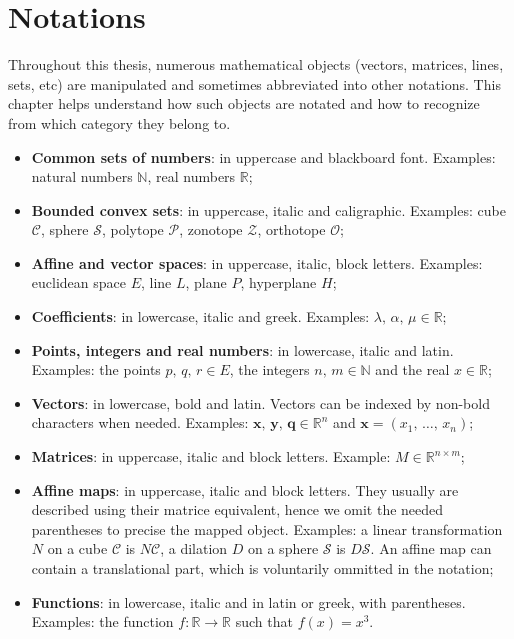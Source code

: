 
\chapter*{Notations}
\label{chapter:notations}

Throughout this thesis, numerous mathematical objects (vectors, matrices, lines, sets, etc) are manipulated and sometimes abbreviated into other notations.
This chapter helps understand how such objects are notated and how to recognize from which category they belong to.

\begin{itemize}
    \item {\textbf{Common sets of numbers}: in uppercase and blackboard font. Examples: natural numbers $\mathbb{N}$, real numbers $\mathbb{R}$;}
    \item {\textbf{Bounded convex sets}: in uppercase, italic and caligraphic. Examples: cube $\mathcal{C}$, sphere $\mathcal{S}$,
    polytope $\mathcal{P}$, zonotope $\mathcal{Z}$, orthotope $\mathcal{O}$;}
    \item{\textbf{Affine and vector spaces}: in uppercase, italic, block letters. Examples: euclidean space $E$, line $L$, plane $P$, hyperplane $H$;}
    \item {\textbf{Coefficients}: in lowercase, italic and greek. Examples: $\lambda,\, \alpha,\, \mu \in\mathbb{R}$;}
    \item {\textbf{Points, integers and real numbers}: in lowercase, italic and latin. Examples: the points $p,\, q,\, r \in E$, the integers $n,\,m\in\mathbb{N}$ and the real $x\in \mathbb{R}$;}
    \item {\textbf{Vectors}: in lowercase, bold and latin. Vectors can be indexed by non-bold characters when needed. Examples: $\mathbf{x},\, \mathbf{y},\, \mathbf{q} \in \mathbb{R}^n$ and $\mathbf{x} = (x_1,\, \dots,\, x_n)$;}
    \item {\textbf{Matrices}: in uppercase, italic and block letters. Example: $M \in \mathbb{R}^{n\times m}$;}
    \item {\textbf{Affine maps}: in uppercase, italic and block letters. They usually are described using their matrice equivalent, hence we omit the needed parentheses to precise the mapped object.
    Examples: a linear transformation $N$ on a cube $\mathcal{C}$ is $N\mathcal{C}$, a dilation $D$ on a sphere $\mathcal{S}$ is $D\mathcal{S}$. 
    An affine map can contain a translational part, which is voluntarily ommitted in the notation;}
    \item {\textbf{Functions}: in lowercase, italic and in latin or greek, with parentheses. Examples: the function $f\colon \mathbb{R}\rightarrow \mathbb{R}$ such that $f(x) = x^3$.}
\end{itemize}

